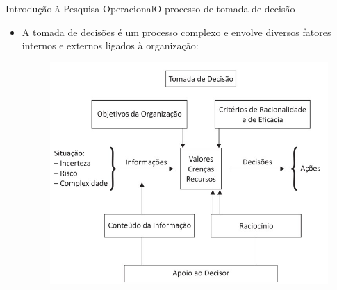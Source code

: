 \documentclass[t]{beamer}
\begin{document}
\begin{ftst}{Introdução à Pesquisa Operacional}{O processo de tomada de decisão}
\begin{itemize}
    \item A tomada de decisões é um processo complexo e envolve diversos fatores internos e externos ligados à organização:
    \begin{figure}
        \centering
        \includegraphics[scale=0.4]{Figuras/tomada_decisao.jpg}
    \end{figure}
\end{itemize}

\end{ftst}

\end{document}
